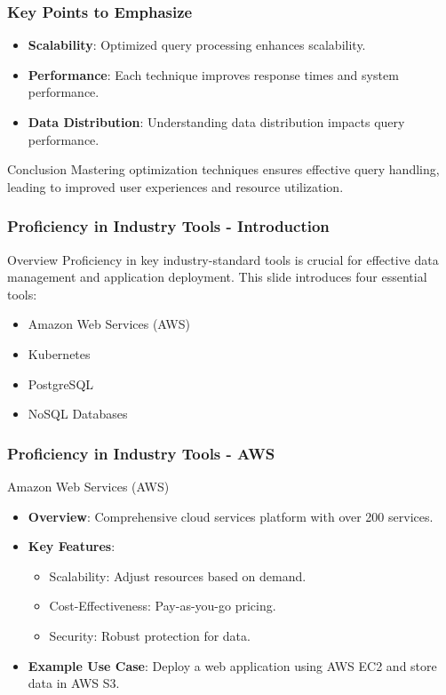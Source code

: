 \documentclass[aspectratio=169]{beamer}
\begin{document}
\begin{frame}[fragile]
    \frametitle{Key Points to Emphasize}
    \begin{itemize}
        \item \textbf{Scalability}: Optimized query processing enhances scalability.
        \item \textbf{Performance}: Each technique improves response times and system performance.
        \item \textbf{Data Distribution}: Understanding data distribution impacts query performance.
    \end{itemize}
    \begin{block}{Conclusion}
        Mastering optimization techniques ensures effective query handling, leading to improved user experiences and resource utilization.
    \end{block}
\end{frame}

\begin{frame}
    \frametitle{Proficiency in Industry Tools - Introduction}
    \begin{block}{Overview}
        Proficiency in key industry-standard tools is crucial for effective data management and application deployment. This slide introduces four essential tools:
    \end{block}
    \begin{itemize}
        \item Amazon Web Services (AWS)
        \item Kubernetes
        \item PostgreSQL
        \item NoSQL Databases
    \end{itemize}
\end{frame}

\begin{frame}[fragile]
    \frametitle{Proficiency in Industry Tools - AWS}
    \begin{block}{Amazon Web Services (AWS)}
        \begin{itemize}
            \item \textbf{Overview}: Comprehensive cloud services platform with over 200 services.
            \item \textbf{Key Features}:
            \begin{itemize}
                \item Scalability: Adjust resources based on demand.
                \item Cost-Effectiveness: Pay-as-you-go pricing.
                \item Security: Robust protection for data.
            \end{itemize}
            \item \textbf{Example Use Case}: Deploy a web application using AWS EC2 and store data in AWS S3.
        \end{itemize}
    \end{block}
\end{frame}
\end{document}
